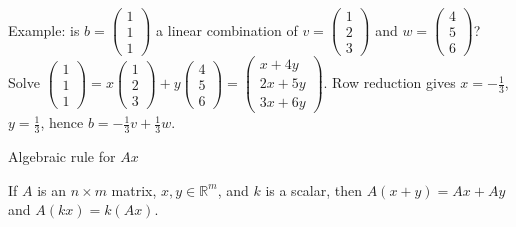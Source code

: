 Example: is \(b = \begin{pmatrix}
1 \\
1 \\
1
\end{pmatrix}\) a linear combination of \(v = \begin{pmatrix}
1 \\
2 \\
3
\end{pmatrix}\) and \(w = \begin{pmatrix}
4 \\
5 \\
6
\end{pmatrix}\)? Solve \(\begin{pmatrix}
1 \\
1 \\
1
\end{pmatrix} = x\begin{pmatrix}
1 \\
2 \\
3
\end{pmatrix} + y\begin{pmatrix}
4 \\
5 \\
6
\end{pmatrix} = \begin{pmatrix}
{x + 4y} \\
{2x + 5y} \\
{3x + 6y}
\end{pmatrix}\). Row reduction gives \(x = - \frac{1}{3}\), \(y = \frac{1}{3}\), hence \(b = - \frac{1}{3}v + \frac{1}{3}w\).

\begin{theorem}{Algebraic rule for \(Ax\)}

If \(A\) is an \(n \times m\) matrix, \(x,y \in \mathbb{R}^{m}\), and \(k\) is a scalar, then \(A\left( {x + y} \right) = Ax + Ay\) and \(A\left( {kx} \right) = k\left( {Ax} \right)\).

\end{theorem}

